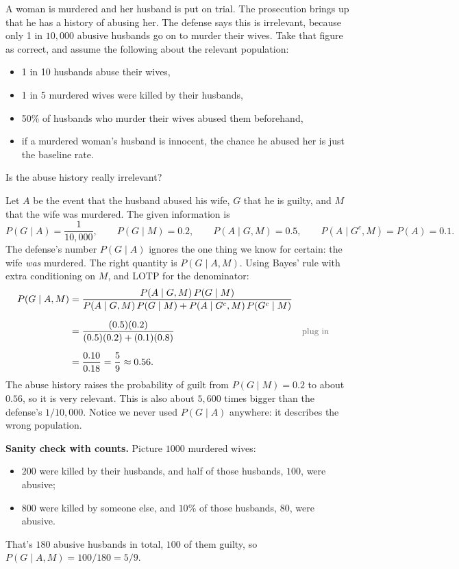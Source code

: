 \begin{example}\label{ex:abuse}
A woman is murdered and her husband is put on trial. The prosecution brings up that he has a history of abusing her. The defense says this is irrelevant, because only 1 in $10{,}000$ abusive husbands go on to murder their wives. Take that figure as correct, and assume the following about the relevant population:
\begin{itemize}
  \item 1 in 10 husbands abuse their wives,
  \item 1 in 5 murdered wives were killed by their husbands,
  \item 50\% of husbands who murder their wives abused them beforehand,
  \item if a murdered woman's husband is innocent, the chance he abused her is just the baseline rate.
\end{itemize}
Is the abuse history really irrelevant?
\end{example}
\begin{solution}
Let $A$ be the event that the husband abused his wife, $G$ that he is guilty, and $M$ that the wife was murdered. The given information is
\[
P(G \mid A) = \frac{1}{10{,}000},
\qquad
P(G \mid M) = 0.2,
\qquad
P(A \mid G, M) = 0.5,
\qquad
P(A \mid G^c, M) = P(A) = 0.1.
\]
The defense's number $P(G \mid A)$ ignores the one thing we know for certain: the wife \emph{was} murdered. The right quantity is $P(G \mid A, M)$. Using Bayes' rule with extra conditioning on $M$, and LOTP for the denominator:
\begin{align*}
P(G \mid A, M)
  &= \frac{P(A \mid G, M)\,P(G \mid M)}{P(A \mid G, M)\,P(G \mid M) + P(A \mid G^c, M)\,P(G^c \mid M)} \\[0.6em]
  &= \frac{(0.5)(0.2)}{(0.5)(0.2) + (0.1)(0.8)}
  && \by{plug in} \\[0.6em]
  &= \frac{0.10}{0.18}
   = \frac{5}{9} \approx 0.56.
\end{align*}
The abuse history raises the probability of guilt from $P(G \mid M) = 0.2$ to about $0.56$, so it is very relevant. This is also about $5{,}600$ times bigger than the defense's $1/10{,}000$. Notice we never used $P(G \mid A)$ anywhere: it describes the wrong population.

\textbf{Sanity check with counts.} Picture $1000$ murdered wives:
\begin{itemize}
  \item $200$ were killed by their husbands, and half of those husbands, $100$, were abusive;
  \item $800$ were killed by someone else, and $10\%$ of those husbands, $80$, were abusive.
\end{itemize}
That's $180$ abusive husbands in total, $100$ of them guilty, so $P(G \mid A, M) = 100/180 = 5/9$.
\end{solution}

